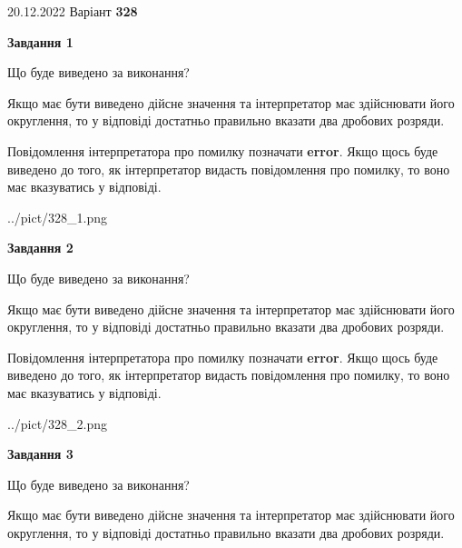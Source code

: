 \documentclass[12pt, ukrainian]{article}
\begin{document}
{20.12.2022 Варіант \No \textbf { 328 }\par}
{
\begin {Large}

{\begin {center}\textbf{Завдання 1}\end {center}}\par
Що буде виведено за виконання? \par

Якщо має бути виведено дійсне значення та інтерпретатор має здійснювати його округлення, 
то у відповіді достатньо правильно вказати два дробових розряди.

Повідомлення інтерпретатора про помилку позначати \textbf{error}.
Якщо щось буде виведено до того, як інтерпретатор видасть повідомлення про помилку, 
то воно має вказуватись у відповіді. \par

\begin{center}
	{../pict/328_1.png}
\end{center}
\newpage

{\begin {center}\textbf{Завдання 2}\end {center}}\par
Що буде виведено за виконання? \par

Якщо має бути виведено дійсне значення та інтерпретатор має здійснювати його округлення, 
то у відповіді достатньо правильно вказати два дробових розряди.

Повідомлення інтерпретатора про помилку позначати \textbf{error}.
Якщо щось буде виведено до того, як інтерпретатор видасть повідомлення про помилку, 
то воно має вказуватись у відповіді. \par

\begin{center}
	{../pict/328_2.png}
\end{center}
\newpage

{\begin {center}\textbf{Завдання 3}\end {center}}\par
Що буде виведено за виконання? \par

Якщо має бути виведено дійсне значення та інтерпретатор має здійснювати його округлення, 
то у відповіді достатньо правильно вказати два дробових розряди.


\end{Large}}
\end{document}

